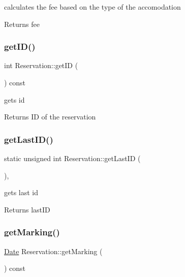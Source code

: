 calculates the fee based on the type of the accomodation 

\begin{DoxyReturn}{Returns}
fee 
\end{DoxyReturn}
\hypertarget{class_reservation_a0d411e0681fc74669776df87fb668983}{}\label{class_reservation_a0d411e0681fc74669776df87fb668983} 
\subsubsection{\texorpdfstring{get\+I\+D()}{getID()}}
{\footnotesize\ttfamily int Reservation\+::get\+ID (\begin{DoxyParamCaption}{ }\end{DoxyParamCaption}) const\hspace{0.3cm}{\ttfamily [inline]}}



gets id 

\begin{DoxyReturn}{Returns}
ID of the reservation 
\end{DoxyReturn}
\hypertarget{class_reservation_ae4d593787bc501a8e4a47ba6b232ff1f}{}\label{class_reservation_ae4d593787bc501a8e4a47ba6b232ff1f} 
\subsubsection{\texorpdfstring{get\+Last\+I\+D()}{getLastID()}}
{\footnotesize\ttfamily static unsigned int Reservation\+::get\+Last\+ID (\begin{DoxyParamCaption}{ }\end{DoxyParamCaption})\hspace{0.3cm}{\ttfamily [inline]}, {\ttfamily [static]}}



gets last id 

\begin{DoxyReturn}{Returns}
last\+ID 
\end{DoxyReturn}
\hypertarget{class_reservation_a0ed41d4b179cb26680898a254c8ccd1d}{}\label{class_reservation_a0ed41d4b179cb26680898a254c8ccd1d} 
\subsubsection{\texorpdfstring{get\+Marking()}{getMarking()}}
{\footnotesize\ttfamily \hyperlink{class_date}{Date} Reservation\+::get\+Marking (\begin{DoxyParamCaption}{ }\end{DoxyParamCaption}) const\hspace{0.3cm}{\ttfamily [inline]}}



